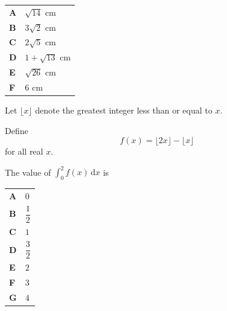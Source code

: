 \documentclass[11pt,a4paper]{article}
\begin{document}
\begin{enumerate}[label=\textbf{\arabic*.},leftmargin=*,itemsep=0pt,start=8]
\par\vspace*{12pt}
\begin{tabularx}{\linewidth}{@{}>{\bfseries}l Y@{}}
A &
$\sqrt{14}$ cm
\\[0.8em]
B &
$3\sqrt{2}$ cm
\\[0.8em]
C &
$2\sqrt{5}$ cm
\\[0.8em]
D &
$1+\sqrt{13}$ cm
\\[0.8em]
E &
$\sqrt{26}$ cm
\\[0.8em]
F &
$6$ cm
\\
\end{tabularx}
\end{enumerate}
\clearpage
\thispagestyle{djspaper}
\vspace*{8pt}
\begin{enumerate}[label=\textbf{\arabic*.},leftmargin=*,itemsep=0pt,start=9]
\questionitem[Integration]
Let $\lfloor x\rfloor$ denote the greatest integer less than or equal to $x$.

Define \[ f(x)=\lfloor 2x\rfloor-\lfloor x\rfloor \] for all real $x$.

The value of $\displaystyle \int_0^2 f(x)\,\mathrm{d}x$ is

\par\vspace*{12pt}
\begin{tabularx}{\linewidth}{@{}>{\bfseries}l Y@{}}
A &
$0$
\\[0.8em]
B &
$\dfrac{1}{2}$
\\[0.8em]
C &
$1$
\\[0.8em]
D &
$\dfrac{3}{2}$
\\[0.8em]
E &
$2$
\\[0.8em]
F &
$3$
\\[0.8em]
G &
$4$
\\
\end{tabularx}
\end{enumerate}
\end{document}
